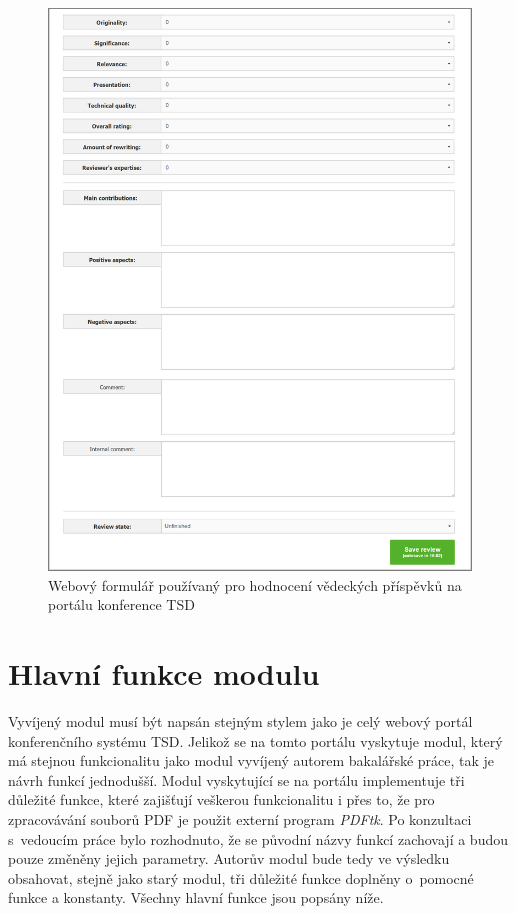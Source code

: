 \begin{figure}[h!]
\centering
\includegraphics[width=15cm]{img/web_formular}
\caption{Webový formulář používaný pro hodnocení vědeckých příspěvků na portálu konference TSD}
\label{fig:web_formular}
\end{figure}

\section{Hlavní funkce modulu}
Vyvíjený modul musí být napsán stejným stylem jako je celý webový portál konferenčního systému TSD. Jelikož se na tomto portálu vyskytuje modul, který má stejnou funkcionalitu jako modul vyvíjený autorem bakalářské práce, tak je návrh funkcí jednodušší. Modul vyskytující se na portálu implementuje tři důležité funkce, které zajišťují veškerou funkcionalitu i přes to, že pro zpracovávání souborů PDF je použit externí program \textit{PDFtk}. Po konzultaci s~vedoucím práce bylo rozhodnuto, že se původní názvy funkcí zachovají a budou pouze změněny jejich parametry. Autorův modul bude tedy ve výsledku obsahovat, stejně jako starý modul, tři důležité funkce doplněny o~pomocné funkce a konstanty. Všechny hlavní funkce jsou popsány níže.  

